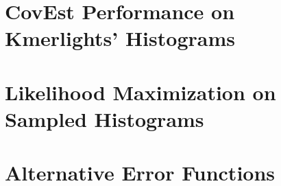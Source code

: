 \section{CovEst Performance on Kmerlights' Histograms}

\section{Likelihood Maximization on Sampled Histograms}
\label{sec:kmergenie-errors}

\section{Alternative Error Functions}
